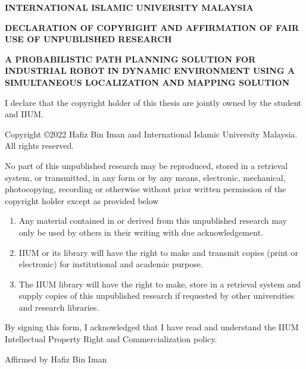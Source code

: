 
\begin{mdframed}
\begin{center}
{\CHAPTERfontsize \textbf{INTERNATIONAL ISLAMIC UNIVERSITY MALAYSIA}}
\vspace{24pt}
\par
{\CHAPTERfontsize \textbf{DECLARATION OF COPYRIGHT AND AFFIRMATION OF
FAIR USE OF UNPUBLISHED RESEARCH}}
\vspace{24pt}
\par
{\CHAPTERfontsize \uppercase{\textbf{
	A Probabilistic Path Planning Solution for Industrial Robot in Dynamic Environment using A Simultaneous Localization and Mapping Solution
}}}
\vspace{24pt}
\par
  \noindent
I declare that the copyright holder of this thesis are jointly owned by the student and IIUM.
\vspace{12pt}
\par
\noindent
\footnotesize{Copyright \copyright 2022 Hafiz Bin Iman and International Islamic University Malaysia. All rights reserved.}
\end{center}
\vspace{12pt}
\par
\noindent
No part of this unpublished research may be reproduced, stored in a retrieval
system, or transmitted, in any form or by any means, electronic, mechanical,
photocopying, recording or otherwise without prior written permission of the
copyright holder except as provided below
\begin{enumerate}
\item Any material contained in or derived from this unpublished research
may only be used by others in their writing with due acknowledgement.
\item IIUM or its library will have the right to make and transmit copies
(print or electronic) for institutional and academic purpose.
\item The IIUM library will have the right to make, store in a retrieval system
and supply copies of this unpublished research if requested by other
universities and research libraries.
\end{enumerate}
By signing this form, I acknowledged that I have read and understand the
IIUM Intellectual Property Right and Commercialization policy.
\par
\vspace{48pt}
\noindent Affirmed by Hafiz Bin Iman
\par

  \vspace{48pt}
  \noindent
  \begin{minipage}{0.4\linewidth}
    \centering
  \end{minipage}
  \hfill
  \begin{minipage}{0.4\linewidth}
    \centering
    \Date
  \end{minipage}

\vspace{28pt}

\end{mdframed}
\newpage

